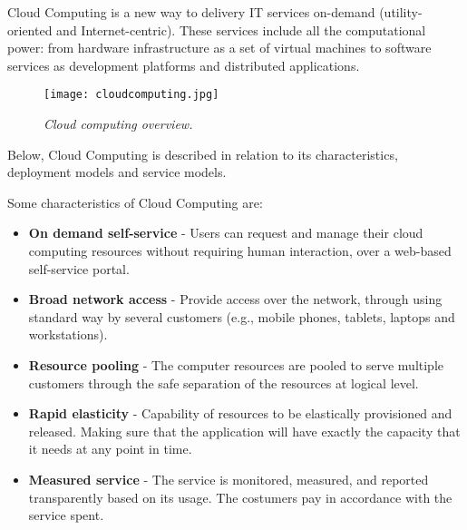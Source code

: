 Cloud Computing is a new way to delivery IT services on-demand (utility-oriented and Internet-centric). These services include all the computational power: from hardware infrastructure as a set of virtual machines to software services as development platforms and distributed applications.

\begin{figure}[!ht]
\begin{center}
\texttt{[image: cloudcomputing.jpg]}
\caption{\small \sl Cloud computing overview.\label{fig:cloudcomputing}}
\end{center}
\end{figure}

Below, Cloud Computing is described in relation to its characteristics, deployment models and service models\cite{schouten2013ibm}.

Some characteristics of Cloud Computing are:
\begin{itemize}
	\item \textbf{On demand self-service} 	- Users can request and manage their cloud computing resources without requiring human interaction, over a web-based self-service portal.
	\item \textbf{Broad network access 	}	- Provide access over the network, through using standard way by several customers (e.g., mobile phones, tablets, laptops and workstations).
	\item \textbf{Resource pooling 		}	- The computer resources are pooled to serve multiple customers through the safe separation of the resources at logical level.
	\item \textbf{Rapid elasticity 		}	- Capability of resources to be elastically provisioned and released. Making sure that the application will have exactly the capacity that it needs at any point in time.
	\item \textbf{Measured service 		}	- The service is monitored, measured, and reported transparently based on its usage. The costumers pay in accordance with the service spent.
\end{itemize}

